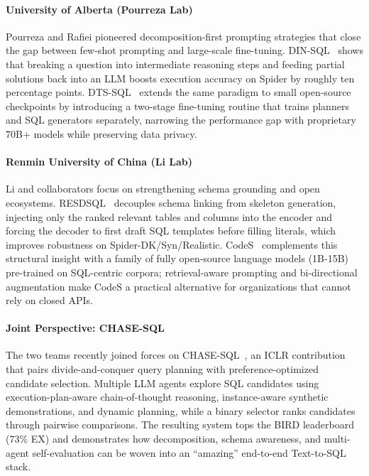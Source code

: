 \paragraph{University of Alberta (Pourreza Lab)}

Pourreza and Rafiei pioneered decomposition-first prompting strategies that close the gap between few-shot prompting and large-scale fine-tuning. DIN-SQL~\cite{pourreza2023dinsql} shows that breaking a question into intermediate reasoning steps and feeding partial solutions back into an LLM boosts execution accuracy on Spider by roughly ten percentage points. DTS-SQL~\cite{pourreza2024dtssql} extends the same paradigm to small open-source checkpoints by introducing a two-stage fine-tuning routine that trains planners and SQL generators separately, narrowing the performance gap with proprietary 70B+ models while preserving data privacy.

\paragraph{Renmin University of China (Li Lab)}

Li and collaborators focus on strengthening schema grounding and open ecosystems. RESDSQL~\cite{li2023resdsql} decouples schema linking from skeleton generation, injecting only the ranked relevant tables and columns into the encoder and forcing the decoder to first draft SQL templates before filling literals, which improves robustness on Spider-DK/Syn/Realistic. CodeS~\cite{li2024codes} complements this structural insight with a family of fully open-source language models (1B-15B) pre-trained on SQL-centric corpora; retrieval-aware prompting and bi-directional augmentation make CodeS a practical alternative for organizations that cannot rely on closed APIs.

\paragraph{Joint Perspective: CHASE-SQL}

The two teams recently joined forces on CHASE-SQL~\cite{pourreza2024chasesql}, an ICLR contribution that pairs divide-and-conquer query planning with preference-optimized candidate selection. Multiple LLM agents explore SQL candidates using execution-plan-aware chain-of-thought reasoning, instance-aware synthetic demonstrations, and dynamic planning, while a binary selector ranks candidates through pairwise comparisons. The resulting system tops the BIRD leaderboard (73\% EX) and demonstrates how decomposition, schema awareness, and multi-agent self-evaluation can be woven into an ``amazing'' end-to-end Text-to-SQL stack.

